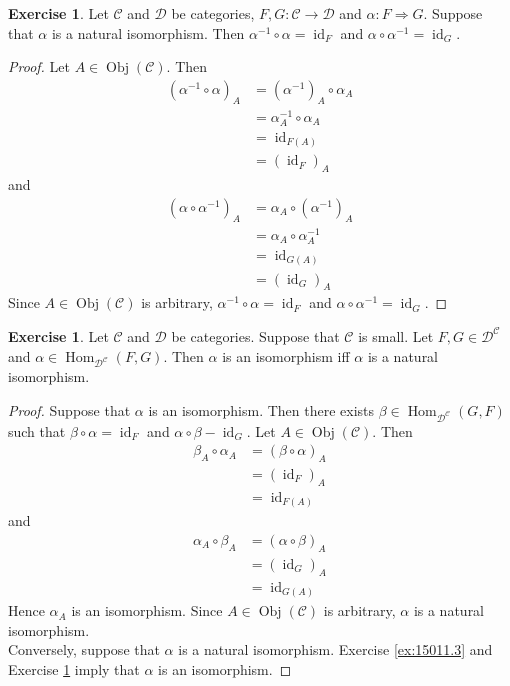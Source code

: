 \documentclass{book}
\theoremstyle{definition}
\newtheorem{ex}[definition]{Exercise}
\newcommand{\al}{\alpha}
\newcommand{\be}{\beta}
\newcommand{\MC}{\mathcal{C}}
\newcommand{\MD}{\mathcal{D}}
\newcommand{\lex}[1]{\label{ex:#1}}
\newcommand{\rex}[1]{Exercise \ref{ex:#1}}
\DeclareMathOperator{\id}{id}
\DeclareMathOperator{\Obj}{Obj}
\DeclareMathOperator{\Hom}{Hom}
\DeclareMathOperator*{\0}{\mbf{0}}
\DeclareMathOperator*{\1}{\mbf{1}}
\begin{document}
	\begin{ex} \lex{15011.4}
		Let $\MC$ and $\MD$ be categories, $F,G: \MC \rightarrow \MD$ and $\al : F \Rightarrow G$. Suppose that $\al$ is a natural isomorphism. Then $\al^{-1} \circ \al = \id_{F}$ and $\al \circ \al^{-1} = \id_G$.
	\end{ex}

	\begin{proof}
		Let $A \in \Obj(\MC)$. Then 
		\begin{align*}
			(\al^{-1} \circ \al )_A 
			& = (\al^{-1})_A \circ \al_A \\
			& = \al_A^{-1} \circ \al_A \\
			& = \id_{F(A)} \\
			& = (\id_F)_A
		\end{align*}
		and 
			\begin{align*}
			(\al \circ \al^{-1} )_A 
			& = \al_A \circ (\al^{-1})_A\\
			& = \al_A \circ \al_A^{-1}\\
			& = \id_{G(A)} \\
			& = (\id_G)_A
		\end{align*}
		Since $A \in \Obj(\MC)$ is arbitrary, $\al^{-1} \circ \al = \id_F$ and $\al \circ \al^{-1} = \id_G$.
	\end{proof}

	\begin{ex} \lex{15011.5}
		Let $\MC$ and $\MD$ be categories. Suppose that $\MC$ is small. Let $F,G \in \MD^{\MC}$ and $\al \in \Hom_{\MD^{\MC}}(F, G)$. Then $\al$ is an isomorphism iff $\al$ is a natural isomorphism.  
	\end{ex}

	\begin{proof}
		Suppose that $\al$ is an isomorphism. Then there exists $\be \in \Hom_{\MD^{\MC}}(G, F)$ such that $\be \circ \al = \id_F$ and $\al \circ \be - \id_G$. Let $A \in \Obj(\MC)$. Then
		\begin{align*}
			\be_A \circ \al_A 
			& = (\be \circ \al)_A \\
			& = (\id_F)_A \\
			& = \id_{F(A)}
		\end{align*}
		and 
		\begin{align*}
			\al_A \circ \be_A
			& = (\al \circ \be)_A \\
			& = (\id_G)_A \\
			& = \id_{G(A)}
		\end{align*}
		Hence $\al_A$ is an isomorphism. Since $A \in \Obj(\MC)$ is arbitrary, $\al$ is a natural isomorphism. \\
		Conversely, suppose that $\al$ is a natural isomorphism. \rex{15011.3} and \rex{15011.4} imply that $\al$ is an isomorphism.
	\end{proof}
\end{document}
